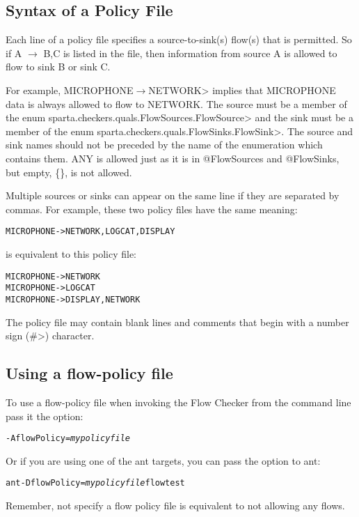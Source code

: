 \subsection{Syntax of a Policy File}

Each line of a policy file specifies a source-to-sink(s) flow(s) that is permitted. So if 
A $\rightarrow$ B,C is listed in the file, then information from source A is allowed to flow
to sink B or sink C.  

For example,
\<MICROPHONE$\rightarrow$NETWORK> implies that
MICROPHONE data is always allowed to flow to NETWORK.  
The source must be a member of the enum
\<sparta.checkers.quals.FlowSources.FlowSource> and the sink must be a
member of the enum 
\<sparta.checkers.quals.FlowSinks.FlowSink>.  The source 
and sink names should not be preceded by the name of the enumeration which contains them.
ANY is allowed just as it is in @FlowSources and @FlowSinks, but empty, \{\}, is not allowed.

Multiple sources or sinks can appear on the same line if they are separated by commas. 
For example,
these two policy files have the same meaning:

\begin{alltt}
   MICROPHONE -> NETWORK, LOGCAT, DISPLAY
\end{alltt}
is equivalent to this policy file:
\begin{alltt}
   MICROPHONE -> NETWORK
   MICROPHONE -> LOGCAT
   MICROPHONE -> DISPLAY, NETWORK
\end{alltt}

The policy file may contain blank lines and comments that begin with 
a number sign (\<\#>) character.

\subsection{Using a flow-policy file}
To use a flow-policy file when invoking the Flow Checker from the
command line pass it the option:
\begin{alltt}
-AflowPolicy=\emph{mypolicyfile}
\end{alltt}

Or if you are using one of the ant targets, you can pass the option to ant:
\begin{alltt}
ant -DflowPolicy=\emph{mypolicyfile} flowtest
\end{alltt}

Remember, not specify a flow policy file is equivalent  to not allowing any flows. 

